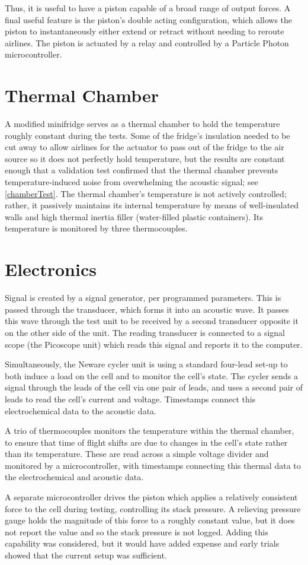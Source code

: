 Thus, it is useful to have a piston capable of a broad range of output forces. A final useful feature is the piston's double acting configuration, which allows the piston to instantaneously either extend or retract without needing to reroute airlines. The piston is actuated by a relay and controlled by a Particle Photon microcontroller.

\section{Thermal Chamber}\label{thermalChamber}
A modified minifridge serves as a thermal chamber to hold the temperature roughly constant during the tests. 
Some of the fridge's insulation needed to be cut away to allow airlines for the actuator to pass out of the fridge to the air source so it does not perfectly hold temperature, but the results are constant enough that a validation test confirmed that the thermal chamber prevents temperature-induced noise from overwhelming the acoustic signal; see \hyperref[chamberTest]{\cref{chamberTest}}.  
The thermal chamber's temperature is not actively controlled; rather, it passively maintains its internal temperature by means of well-insulated walls and high thermal inertia filler (water-filled plastic containers). 
Its temperature is monitored by three thermocouples.

\section{Electronics}


Signal is created by a signal generator, per programmed parameters. This is passed through the transducer, which forms it into an acoustic wave. It passes this wave through the test unit to be received by a second transducer opposite it on the other side of the unit. The reading transducer is connected to a signal scope (the Picoscope unit) which reads this signal and reports it to the computer.

Simultaneously, the Neware cycler unit is using a standard four-lead set-up to both induce a load on the cell and to monitor the cell's state. The cycler sends a signal through the leads of the cell via one pair of leads, and uses a second pair of leads to read the cell's current and voltage. Timestamps connect this electrochemical data to the acoustic data.

A trio of thermocouples monitors the temperature within the thermal chamber, to ensure that time of flight shifts are due to changes in the cell's state rather than its temperature. These are read across a simple voltage divider and monitored by a microcontroller, with timestamps connecting this thermal data to the electrochemical and acoustic data.

A separate microcontroller drives the piston which applies a relatively consistent force to the cell during testing, controlling its stack pressure. A relieving pressure gauge holds the magnitude of this force to a roughly constant value, but it does not report the value and so the stack pressure is not logged. Adding this capability was considered, but it would have added expense and early trials showed that the current setup was sufficient.